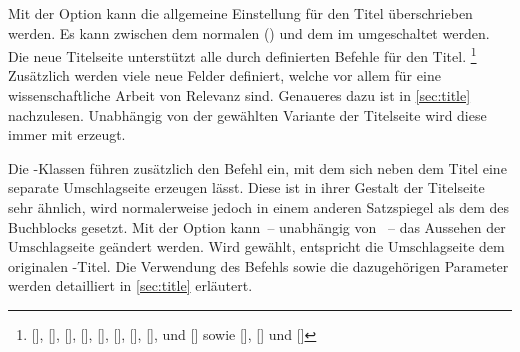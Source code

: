 \begin{Declaration*}{}
\begin{Declaration*}{}
\begin{Declaration*}{}
\begin{Declaration}[%
  v2.03!\Option{cdtitle=bicolor}:%
    Farbeinsatz nur im Kopf mit farbig abgesetztem Querbalken;
  v2.03!\Option{cdtitle=fullcolor}:%
    voller Farbeinsatz mit farbig abgesetztem Querbalken;
  v2.04!\Option{cdtitle=barcolor}:nur farbig abgesetzter Querbalken;%
]{}
\printdeclarationlist%
%
%
Mit der Option  kann die allgemeine Einstellung für den Titel 
überschrieben werden. Es kann zwischen dem normalen () 
und dem im \CD umgeschaltet werden. Die neue Titelseite unterstützt alle durch 
\KOMAScript{} definierten Befehle für den Titel.%
\footnote{\raggedright%
  [],
  [],
  [], [],
  [], [],
  [], [],
   und [] sowie
  [],
  []
  und []
}
Zusätzlich werden viele neue Felder definiert, welche vor allem für eine 
wissenschaftliche Arbeit von Relevanz sind. Genaueres dazu 
ist in \autoref{sec:title} nachzulesen. Unabhängig von der gewählten Variante 
der Titelseite wird diese immer mit  erzeugt.
\end{Declaration}

\begin{Declaration}[%
  v2.02;%
  v2.03!\Option{cdcover=bicolor}:%
    Farbeinsatz nur im Kopf mit farbig abgesetztem Querbalken;
  v2.03!\Option{cdcover=fullcolor}:%
    voller Farbeinsatz mit farbig abgesetztem Querbalken;
  v2.04!\Option{cdcover=barcolor}:nur farbig abgesetzter Querbalken;%
]{}
\printdeclarationlist%
%
%
Die \TUDScript-Klassen führen zusätzlich den Befehl  ein, mit 
dem sich neben dem Titel eine separate Umschlagseite erzeugen lässt. Diese ist 
in ihrer Gestalt der Titelseite sehr ähnlich, wird normalerweise jedoch in 
einem anderen Satzspiegel als dem des Buchblocks gesetzt. Mit der Option 
 kann~-- unabhängig von ~-- das Aussehen der 
Umschlagseite geändert werden. Wird  gewählt, entspricht 
die Umschlagseite dem originalen \KOMAScript-Titel. Die Verwendung des Befehls 
 sowie die dazugehörigen Parameter werden detailliert in 
\autoref{sec:title} erläutert.
\end{Declaration}


\end{Declaration*}
\end{Declaration*}
\end{Declaration*}
